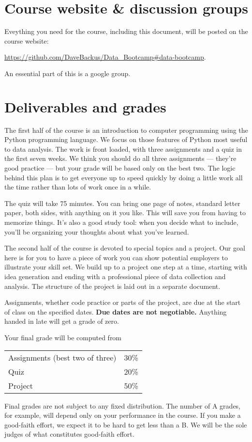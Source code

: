 \documentclass[11pt]{article}
\begin{document}
\section*{Course website \& discussion groups}

Eveything you need for the course, including this document, will be posted on
the course website:
%
\vspace{-0.2in}
\begin{center}
\url{https://github.com/DaveBackus/Data_Bootcamp#data-bootcamp}.
\end{center}
\vspace{-0.2in}
%
An essential part of this is a google group.


\section*{Deliverables and grades}

The first half of the course is an introduction to computer programming
using the Python programming language.
We focus on those features of Python most useful to data analysis.
The work is front loaded, with three assignments and a quiz
in the first seven weeks.
We think you should do all three assignments --- they're good practice ---
but your grade will be based only on the best two.
The logic behind this plan is to get everyone up to speed quickly
by doing a little work all the time rather than lots of work once in a while.

The quiz will take 75 minutes.
You can bring one page of notes, standard letter paper,
both sides, with anything on it you like.
This will save you from having to memorize things.
It's also a good study tool:  when you decide what to include,
you'll be organizing your thoughts about what you've learned.


The second half of the course is devoted to special topics and a project.
Our goal here is for you to have a piece of work you can show potential employers
to illustrate your skill set.
We build up to a project one step at a time, starting with idea generation and ending
with a professional piece of data collection and analysis.
The structure of the project is laid out in a separate document.

Assignments, whether code practice or parts of the project,
are due at the start of class on the specified dates.
{\bf Due dates are not negotiable.\/}
Anything handed in late will get a grade of zero.

Your final grade will be computed from
\begin{center}
\begin{tabular}{ll}
Assignments (best two of three) & 30\% \\
Quiz        & 20\% \\
Project     & 50\% \\
\end{tabular}
\end{center}
Final grades are not subject to any fixed distribution.
The number of A grades, for example,
will depend only on your performance in the course.
If you make a good-faith effort,
we expect it to be hard to get less than a B.
We will be the sole judges of what constitutes good-faith effort.
\end{document}
